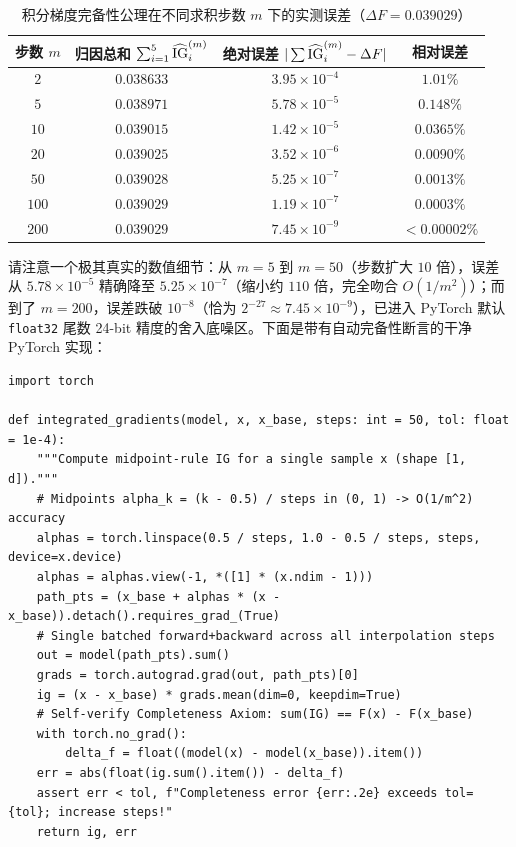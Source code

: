 \begin{table}[htbp]
  \centering
  \caption{积分梯度完备性公理在不同求积步数 $m$ 下的实测误差（$\Delta F = 0.039029$）}
  \label{tab:ig-conv}
  \small
  \begin{tabular}{@{}cccc@{}}
    \toprule
    步数 $m$ & 归因总和 $\sum_{i=1}^5 \widehat{\operatorname{IG}}_i^{(m)}$ & 绝对误差 $|\sum \widehat{\operatorname{IG}}_i^{(m)} - \Delta F|$ & 相对误差 \\
    \midrule
    $2$   & $0.038633$ & $3.95 \times 10^{-4}$ & $1.01\%$ \\
    $5$   & $0.038971$ & $5.78 \times 10^{-5}$ & $0.148\%$ \\
    $10$  & $0.039015$ & $1.42 \times 10^{-5}$ & $0.0365\%$ \\
    $20$  & $0.039025$ & $3.52 \times 10^{-6}$ & $0.0090\%$ \\
    $50$  & $0.039028$ & $5.25 \times 10^{-7}$ & $0.0013\%$ \\
    $100$ & $0.039029$ & $1.19 \times 10^{-7}$ & $0.0003\%$ \\
    $200$ & $0.039029$ & $7.45 \times 10^{-9}$ & $< 0.00002\%$ \\
    \bottomrule
  \end{tabular}
\end{table}

请注意一个极其真实的数值细节：从 $m=5$ 到 $m=50$（步数扩大 $10$ 倍），误差从 $5.78 \times 10^{-5}$ 精确降至 $5.25 \times 10^{-7}$（缩小约 $110$ 倍，完全吻合 $O(1/m^2)$）；而到了 $m=200$，误差跌破 $10^{-8}$（恰为 $2^{-27} \approx 7.45 \times 10^{-9}$），已进入 PyTorch 默认 \texttt{float32} 尾数 24-bit 精度的舍入底噪区。下面是带有自动完备性断言的干净 PyTorch 实现：

\begin{lstlisting}[caption={带完备性公理自检的积分梯度（中点黎曼求积，PyTorch）}]
import torch

def integrated_gradients(model, x, x_base, steps: int = 50, tol: float = 1e-4):
    """Compute midpoint-rule IG for a single sample x (shape [1, d])."""
    # Midpoints alpha_k = (k - 0.5) / steps in (0, 1) -> O(1/m^2) accuracy
    alphas = torch.linspace(0.5 / steps, 1.0 - 0.5 / steps, steps, device=x.device)
    alphas = alphas.view(-1, *([1] * (x.ndim - 1)))
    path_pts = (x_base + alphas * (x - x_base)).detach().requires_grad_(True)
    # Single batched forward+backward across all interpolation steps
    out = model(path_pts).sum()
    grads = torch.autograd.grad(out, path_pts)[0]
    ig = (x - x_base) * grads.mean(dim=0, keepdim=True)
    # Self-verify Completeness Axiom: sum(IG) == F(x) - F(x_base)
    with torch.no_grad():
        delta_f = float((model(x) - model(x_base)).item())
    err = abs(float(ig.sum().item()) - delta_f)
    assert err < tol, f"Completeness error {err:.2e} exceeds tol={tol}; increase steps!"
    return ig, err
\end{lstlisting}


